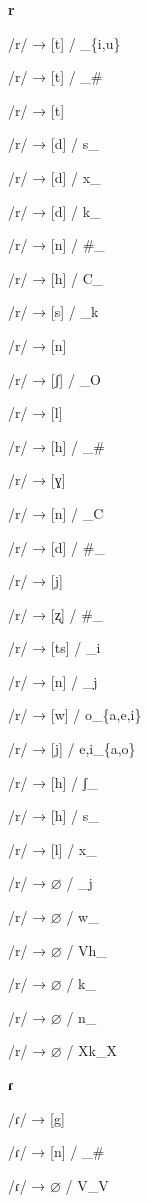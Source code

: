 \begin{center}\textbf{r}\end{center}
\begin{multicols}{4}
\noindent /r/ → [t] / \_\{i,u\}

\noindent /r/ → [t] / \_\#

\noindent /r/ → [t]

\noindent /r/ → [d] / s\_

\noindent /r/ → [d] / x\_

\noindent /r/ → [d] / k\_

\noindent /r/ → [n] / \#\_

\noindent /r/ → [h] / C\_

\noindent /r/ → [s] / \_k

\noindent /r/ → [n]

\noindent /r/ → [ʃ] / \_O

\noindent /r/ → [l]

\noindent /r/ → [h] / \_\#

\noindent /r/ → [ɣ]

\noindent /r/ → [n] / \_C

\noindent /r/ → [d] / \#\_

\noindent /r/ → [j]

\noindent /r/ → [ʐ] / \#\_

\noindent /r/ → [ts] / \_i

\noindent /r/ → [n] / \_j

\noindent /r/ → [w] / o\_\{a,e,i\}

\noindent /r/ → [j] / {e,i}\_\{a,o\}

\noindent /r/ → [h] / ʃ\_

\noindent /r/ → [h] / s\_

\noindent /r/ → [l] / x\_

\noindent /r/ → $\varnothing$ / \_j

\noindent /r/ → $\varnothing$ / w\_

\noindent /r/ → $\varnothing$ / Vh\_

\noindent /r/ → $\varnothing$ / k\_

\noindent /r/ → $\varnothing$ / n\_

\noindent /r/ → $\varnothing$ / Xk\_X
\end{multicols}


\begin{center}\textbf{ɾ}\end{center}
\begin{multicols}{4}
\noindent /ɾ/ → [g]

\noindent /ɾ/ → [n] / \_\#

\noindent /ɾ/ → $\varnothing$ / V\_V
\end{multicols}


